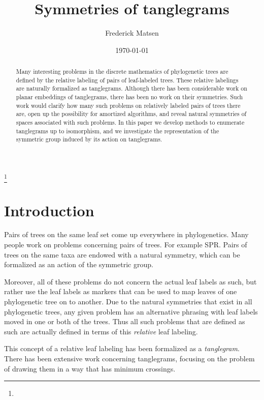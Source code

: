 \documentclass{amsart}
\begin{document}
\title{Symmetries of tanglegrams}
\author[Matsen]{Frederick Matsen}
\address{}
\thanks{}

\date{\today}

\begin{abstract}
Many interesting problems in the discrete mathematics of phylogenetic trees are defined by the relative labeling of pairs of leaf-labeled trees.
These relative labelings are naturally formalized as tanglegrams.
Although there has been considerable work on planar embeddings of tanglegrams, there has been no work on their symmetries.
Such work would clarify how many such problems on relatively labeled pairs of trees there are, open up the possibility for amortized algorithms, and reveal natural symmetries of spaces associated with such problems.
In this paper we develop methods to enumerate tanglegrams up to isomorphism, and we investigate the representation of the symmetric group induced by its action on tanglegrams.
\end{abstract}

\maketitle



\section{Introduction}
Pairs of trees on the same leaf set come up everywhere in phylogenetics.
Many people work on problems concerning pairs of trees.
For example SPR.
Pairs of trees on the same taxa are endowed with a natural symmetry, which can be formalized as an action of the symmetric group.

Moreover, all of these problems do not concern the actual leaf labels as such, but rather use the leaf labels as markers that can be used to map leaves of one phylogenetic tree on to another.
Due to the natural symmetries that exist in all phylogenetic trees, any given problem has an alternative phrasing with leaf labels moved in one or both of the trees.
Thus all such problems that are defined as such are actually defined in terms of this \textit{relative} leaf labeling.

This concept of a relative leaf labeling has been formalized as a \textit{tanglegram}.
There has been extensive work concerning tanglegrams, focusing on the problem of drawing them in a way that has minimum crossings.
\end{document}

